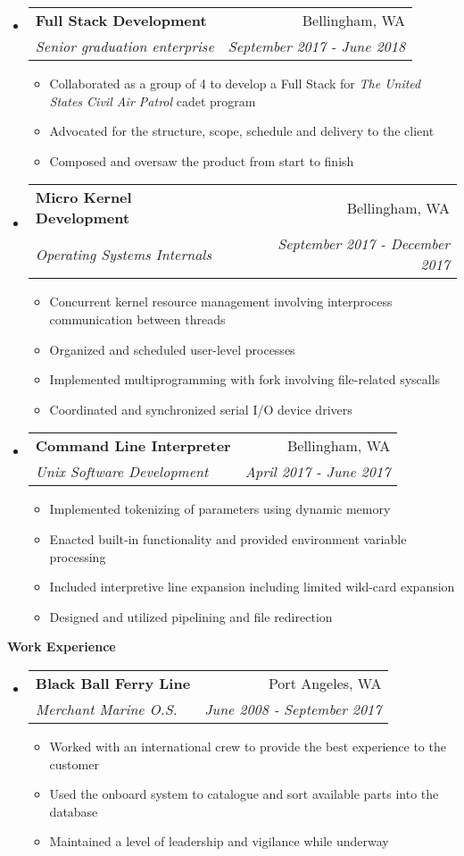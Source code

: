 \documentclass[letterpaper,11pt]{article}
\makeatletter
\newcommand{\resitem}[1]{\item #1 \vspace{-2pt}}
\newcommand{\resheading}[1]{{\large \colorbox{mygrey}{\begin{minipage}{\textwidth}{\textbf{#1 \vphantom{p\^{E}}}}\end{minipage}}}}
\newcommand{\ressubheading}[4]{
\begin{tabular*}{7.0in}{l@{\extracolsep{\fill}}r}
		\textbf{#1} & #2 \\
		\textit{#3} & \textit{#4} \\
\end{tabular*}\vspace{-6pt}}
\makeatother
\begin{document}
\begin{itemize}
\item
	\ressubheading{Full Stack Development}{Bellingham, WA}{Senior graduation enterprise}{September 2017 - June 2018}
	\begin{itemize}
		\resitem{Collaborated as a group of 4 to develop a Full Stack for \emph{The United States Civil Air Patrol} cadet program}
		\resitem{Advocated for the structure, scope, schedule and delivery to the client}
		\resitem{Composed and oversaw the product from start to finish}
	\end{itemize}
\item
	\ressubheading{Micro Kernel Development}{Bellingham, WA}{Operating Systems Internals}{September 2017 - December 2017}
	\begin{itemize}
		\resitem{Concurrent kernel resource management involving interprocess communication between threads}
		\resitem{Organized and scheduled user-level processes}
		\resitem{Implemented multiprogramming with fork involving file-related syscalls}
		\resitem{Coordinated and synchronized serial I/O device drivers}
	\end{itemize}
\item
	\ressubheading{Command Line Interpreter}{Bellingham, WA}{Unix Software Development}{April 2017 - June 2017}
	\begin{itemize}
		\resitem{Implemented tokenizing of parameters using dynamic memory}
		\resitem{Enacted built-in functionality and provided environment variable processing}
		\resitem{Included interpretive line expansion including limited wild-card expansion}
		\resitem{Designed and utilized pipelining and file redirection}
	\end{itemize}
\end{itemize}
\resheading{Work Experience}
\begin{itemize}
\item
	\ressubheading{Black Ball Ferry Line}{Port Angeles, WA}{Merchant Marine O.S.}{June 2008 - September 2017}
	\begin{itemize}	
		\resitem{Worked with an international crew to provide the best experience to the customer}
		\resitem{Used the onboard system to catalogue and sort available parts into the database}
		\resitem{Maintained a level of leadership and vigilance while underway}
	\end{itemize}
\end{itemize}
\end{document}
